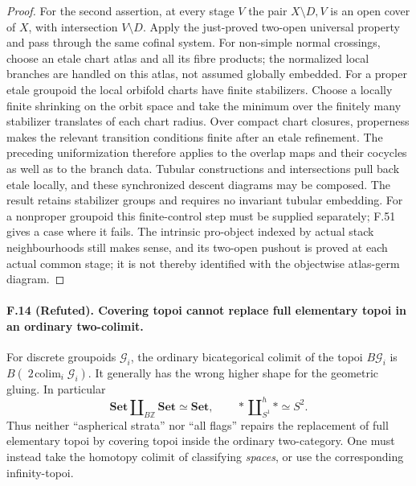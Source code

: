 \begin{proof}
For the second assertion, at every stage $V$ the pair
$X\setminus D,V$ is an open cover of $X$, with intersection
$V\setminus D$. Apply the just-proved two-open universal property and
pass through the same cofinal system. For non-simple normal crossings,
choose an etale chart atlas and all its fibre products; the normalized
local branches are handled on this atlas, not assumed globally embedded.
For a proper etale groupoid the local orbifold charts have finite
stabilizers. Choose a locally finite shrinking on the orbit space and
take the minimum over the finitely many stabilizer translates of each
chart radius. Over compact chart closures, properness makes the relevant
transition conditions finite after an etale refinement. The preceding
uniformization therefore applies to the overlap maps and their cocycles
as well as to the branch data. Tubular constructions and intersections
pull back etale locally, and these synchronized descent diagrams may be
composed. The result retains stabilizer groups and requires no invariant
tubular embedding. For a nonproper groupoid this finite-control step
must be supplied separately; F.51 gives a case where it fails. The
intrinsic pro-object indexed by actual stack neighbourhoods still makes
sense, and its two-open pushout is proved at each actual common stage;
it is not thereby identified with the objectwise atlas-germ diagram.
\end{proof}

\paragraph{F.14 (Refuted). Covering topoi cannot replace full elementary
topoi in an ordinary two-colimit.}
For discrete groupoids $\mathcal G_i$, the ordinary bicategorical colimit
of the topoi $B\mathcal G_i$ is
$B(\operatorname*{2\!colim}_i\mathcal G_i)$. It generally has the wrong
higher shape for the geometric gluing. In particular
\[
 \mathbf{Set}\amalg_{B\mathbb Z}\mathbf{Set}\simeq\mathbf{Set},
 \qquad *\amalg_{S^1}^{h}*\simeq S^2.
\]
Thus neither ``aspherical strata'' nor ``all flags'' repairs the
replacement of full elementary topoi by covering topoi inside the
ordinary two-category. One must instead take the homotopy colimit of
classifying \emph{spaces}, or use the corresponding infinity-topoi.

